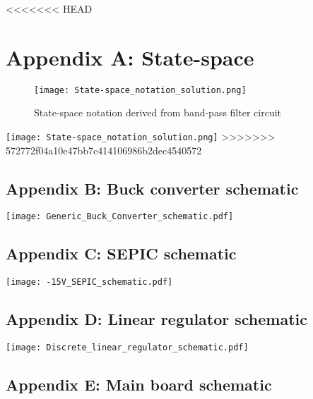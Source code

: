 <<<<<<< HEAD
\chapter*{Appendix A: State-space}
\label{chap:appendix-A-statespace}


\begin{figure}[ht]
    \texttt{[image: State-space\_notation\_solution.png]}
    \caption{State-space notation derived from band-pass filter circuit}
    \label{fig:state-space-derived-bpf}
\end{figure}


    \texttt{[image: State-space\_notation\_solution.png]}
\newpage
\newpage
>>>>>>> 572772f04a10e47bb7c414106986b2dec4540572

\section*{Appendix B: Buck converter schematic}
\texttt{[image: Generic\_Buck\_Converter\_schematic.pdf]}

\section*{Appendix C: SEPIC schematic}
\texttt{[image: -15V\_SEPIC\_schematic.pdf]}

\section*{Appendix D: Linear regulator schematic}
\texttt{[image: Discrete\_linear\_regulator\_schematic.pdf]}

\section*{Appendix E: Main board schematic}

